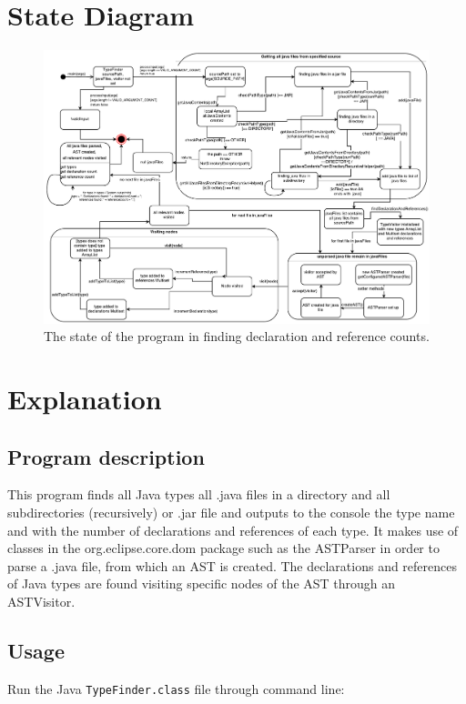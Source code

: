 \documentclass[12p]{article}
\newcommand{\code}[1]{\texttt{#1}}
\begin{document}
\newpage

\section{State Diagram}
\begin{figure}[H]
  \includegraphics[width=1.0\textwidth]{StateDiagram_Iteration2.pdf}
  \caption{The state of the program in finding declaration and reference counts.} %
  \label{fig:state}
\end{figure}

\newpage
\section{Explanation}
\subsection{Program description}
This program finds all Java types all .java files in a directory and all subdirectories (recursively) or .jar file and outputs to the console the type name and with the number of declarations and references of each type.
It makes use of classes in the org.eclipse.core.dom package such as the ASTParser in order to parse a .java file, from which an AST is created.
The declarations and references of Java types are found visiting specific nodes of the AST through an ASTVisitor.

\subsection{Usage}
Run the Java \code{TypeFinder.class} file through command line:
\end{document}
